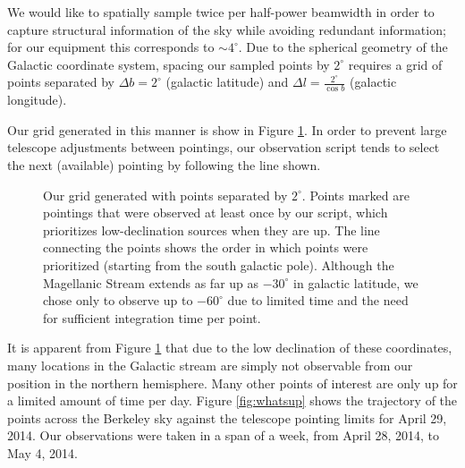 \documentclass[12pt]{article}
\begin{document}
We would like to spatially sample twice per half-power beamwidth in order to capture structural information of the sky while avoiding redundant information; for our equipment this corresponds to $\sim4^\circ$. Due to the spherical geometry of the Galactic coordinate system, spacing our sampled points by $2^\circ$ requires a grid of points separated by $\Delta{b}=2^\circ$ (galactic latitude) and $\Delta{l}=\frac{2^\circ}{\cos{b}}$ (galactic longitude).

Our grid generated in this manner is show in Figure \ref{fig:grid}. In order to prevent large telescope adjustments between pointings, our observation script tends to select the next (available) pointing by following the line shown.

\begin{figure}[H]
\caption[SODUMB]{Our grid generated with points separated by $2^\circ$. Points marked are pointings that were observed at least once by our script, which prioritizes low-declination sources when they are up. The line connecting the points shows the order in which points were prioritized (starting from the south galactic pole). Although the Magellanic Stream extends as far up as $-30^\circ$ in galactic latitude, we chose only to observe up to $-60^\circ$ due to limited time and the need for sufficient integration time per point.
}
\label{fig:grid}
\end{figure}

It is apparent from Figure \ref{fig:grid} that due to the low declination of these coordinates, many locations in the Galactic stream are simply not observable from our position in the northern hemisphere. Many other points of interest are only up for a limited amount of time per day. Figure \ref{fig:whatsup} shows the trajectory of the points across the Berkeley sky against the telescope pointing limits for April 29, 2014. Our observations were taken in a span of a week, from April 28, 2014, to May 4, 2014.
\end{document}
